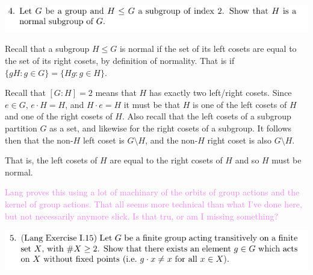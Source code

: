 \documentclass[12pt,letterpaper,boxed]{hmcpset}
\newcommand{\wg}[1]{\textcolor{violet}{#1}}
\begin{document}
\newpage


\begin{problem}
	\includegraphics[scale=0.8]{4.png}
	\hfill
\end{problem}

\begin{solution}
Recall that a subgroup $H \leq G$ is normal if the set of
its left cosets are equal to the set of its right cosets, by
definition of normality. That is if
$\{g H : g \in G\} = \{H g : g \in H\}$. 

Recall that $[G: H] = 2$ means that $H$ has exactly two left/right
cosets. Since $e \in G$, $e \cdot H = H$, and $H \cdot e = H$ it must be that $H$ is
one of the left cosets of $H$ and one of the right cosets of $H$.
Also recall that the left cosets of a subgroup partition $G$ as a set, and likewise
for the right cosets of a subgroup. It follows then that the non-$H$
left coset is $G \setminus H$, and the non-$H$ right coset is also $G
\setminus H$.

That is, the left cosets of $H$ are equal to the right cosets of $H$
and so $H$ must be normal. 

\wg{Lang proves this using a lot of machinary of the orbits of group
actions and the kernel of group actions. That all seems more technical
than what I've done here, but not necessarily anymore slick. Is that
tru, or am I missing something?}

\end{solution}

\newpage



\begin{problem}
	\includegraphics[scale=0.8]{5.png}
	\hfill
\end{problem}

\begin{solution}
\end{solution}

\newpage
\end{document}
